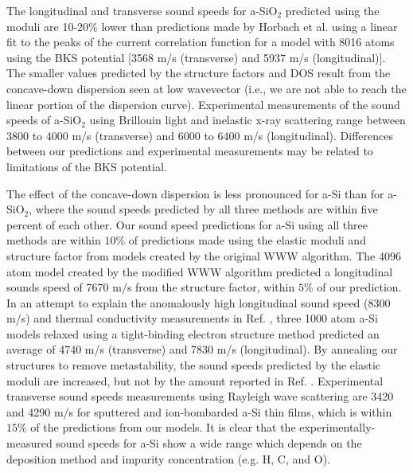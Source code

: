 \documentclass[aps,prb,onecolumn,preprint,superscriptaddress,footinbib,amsmath,amssymb,floatfix]{revtex4}
\begin{document}
The longitudinal and transverse sound speeds for 
a-SiO$_2$ predicted using the moduli are 10-20\%  
lower than predictions made by Horbach et al. using a linear fit 
to the peaks of the 
current correlation function for a model with 
8016 atoms using the BKS potential 
[3568 m/s (transverse) and 5937 m/s (longitudinal)].
\cite{horbach_high_2001} The smaller 
values predicted by the structure factors and DOS 
result from the concave-down dispersion seen at low 
wavevector (i.e., we are not able to reach 
the linear portion of the dispersion curve).\cite{horbach_high_2001} 
Experimental measurements of the sound speeds of a-SiO$_2$ 
using Brillouin light and inelastic x-ray 
scattering range between 3800 to 4000 m/s (transverse) and 
6000 to 6400 m/s (longitudinal).
\cite{vacher_ultrasonic_1981,benassi_evidence_1996,
ruocco_high-frequency_2001,polian_elastic_2002,
ruzicka_evidence_2004} Differences between our predictions and 
experimental measurements may be related to limitations of the 
BKS potential.

The effect of the concave-down dispersion
is less pronounced for a-Si than for a-SiO$_2$, where the sound speeds 
predicted by all three methods are within five percent of each other. 
Our sound speed predictions for a-Si using all three methods
are within $10\%$ of predictions made using the elastic moduli
\cite{kluge_elastic_1988,feldman_elastic_1991} 
and structure factor\cite{feldman_calculations_2002} 
from models created by the original WWW algorithm.
\cite{wooten_computer_1985} 
The 4096 atom model created by the modified WWW algorithm 
\cite{barkema_high-quality_2000} predicted a longitudinal sounds 
speed of 7670 m/s from the structure factor,
\cite{christie_vibrational_2007} within $5\%$ of our prediction. 
In an attempt to explain the 
anomalously high longitudinal sound speed (8300 m/s) and 
thermal conductivity measurements in Ref. , 
three 1000 atom a-Si models relaxed using a tight-binding electron 
structure method predicted an average of 4740 m/s (transverse) and 
7830 m/s (longitudinal).\cite{liu_high_2009} By annealing our 
structures to remove metastability, 
the sound speeds predicted by the elastic moduli are increased, but 
not by the amount reported in Ref. . 
Experimental transverse sound speeds measurements using Rayleigh wave 
scattering are 3420 and 4290 m/s for sputtered 
and ion-bombarded a-Si thin films,\cite{vacher_attenuation_1980} which 
is within $15\%$ of the predictions from our models. 
It is clear that the experimentally-measured sound speeds for a-Si 
show a wide range which depends on the deposition method and impurity 
concentration (e.g. H, C, and O).
\cite{vacher_attenuation_1980,liu_high_2009,yang_anomalously_2010}
\end{document}
